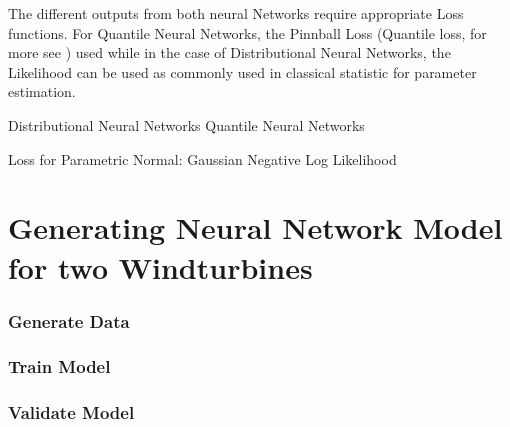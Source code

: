 The different outputs from both neural Networks require appropriate Loss functions. For Quantile Neural Networks, the Pinnball Loss (Quantile loss, for more see \cite{Steinwart_2011}) used while in the case of Distributional Neural Networks, the Likelihood can be used as commonly used in classical statistic for parameter estimation. 

\cite{Akpabio} \cite{Marcjasz_2023}


Distributional Neural Networks
Quantile Neural Networks

Loss for Parametric Normal: Gaussian Negative Log Likelihood


\section{Generating Neural Network Model for two Windturbines}

\subsubsection{Generate Data}

\subsubsection{Train Model}

\subsubsection{Validate Model}